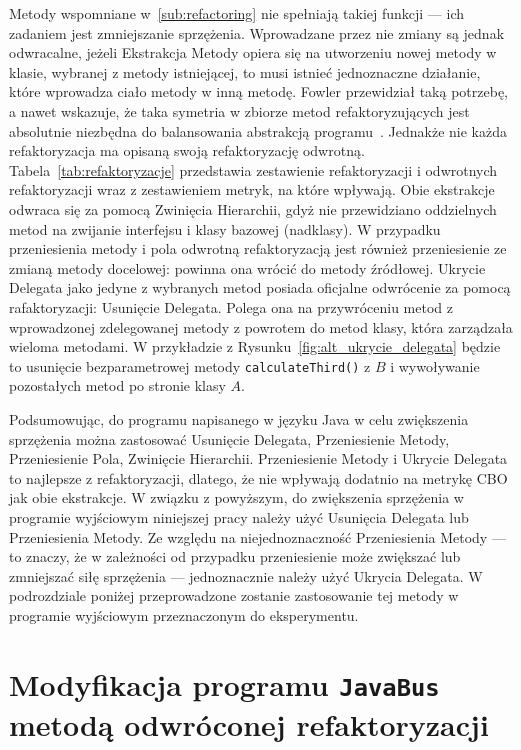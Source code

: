 Metody wspomniane w~\ref{sub:refactoring} nie spełniają takiej funkcji --- ich zadaniem jest zmniejszanie sprzężenia.
Wprowadzane przez nie zmiany są jednak odwracalne, jeżeli Ekstrakcja Metody opiera się na utworzeniu nowej
metody w klasie, wybranej z metody istniejącej, to musi istnieć jednoznaczne działanie, które wprowadza ciało metody
w inną metodę.
Fowler przewidział taką potrzebę, a nawet wskazuje, że taka symetria w zbiorze metod refaktoryzujących jest absolutnie
niezbędna do balansowania abstrakcją programu~\cite{fowler2018refactoring}.
Jednakże nie każda refaktoryzacja ma opisaną swoją refaktoryzację odwrotną.
Tabela~\ref{tab:refaktoryzacje} przedstawia zestawienie refaktoryzacji i odwrotnych refaktoryzacji wraz z
zestawieniem metryk, na które wpływają.
Obie ekstrakcje odwraca się za pomocą Zwinięcia Hierarchii, gdyż nie przewidziano oddzielnych metod na zwijanie
interfejsu i klasy bazowej (nadklasy).
W przypadku przeniesienia metody i pola odwrotną refaktoryzacją jest również przeniesienie ze zmianą metody
docelowej: powinna ona wrócić do metody źródłowej.
Ukrycie Delegata jako jedyne z wybranych metod posiada oficjalne odwrócenie za pomocą rafaktoryzacji: Usunięcie
Delegata.
Polega ona na przywróceniu metod z wprowadzonej zdelegowanej metody z powrotem do metod klasy, która zarządzała
wieloma metodami.
W przykładzie z Rysunku~\ref{fig:alt_ukrycie_delegata} będzie to usunięcie bezparametrowej metody
\texttt{calculateThird()} z \(B\) i wywoływanie pozostałych metod po stronie klasy \(A\).

Podsumowując, do programu napisanego w języku Java w celu zwiększenia sprzężenia można zastosować Usunięcie
Delegata, Przeniesienie Metody, Przeniesienie Pola, Zwinięcie Hierarchii.
Przeniesienie Metody i Ukrycie Delegata to najlepsze z refaktoryzacji, dlatego, że nie wpływają dodatnio na metrykę
CBO jak obie ekstrakcje.
W związku z powyższym, do zwiększenia sprzężenia w programie wyjściowym niniejszej pracy należy użyć Usunięcia
Delegata lub Przeniesienia Metody.
Ze względu na niejednoznaczność Przeniesienia Metody --- to znaczy, że w zależności od przypadku przeniesienie może
zwiększać lub zmniejszać siłę sprzężenia --- jednoznacznie należy użyć Ukrycia Delegata.
W podrozdziale poniżej przeprowadzone zostanie zastosowanie tej metody w programie wyjściowym przeznaczonym do
eksperymentu.

\section{Modyfikacja programu \texttt{JavaBus} metodą odwróconej refaktoryzacji}

